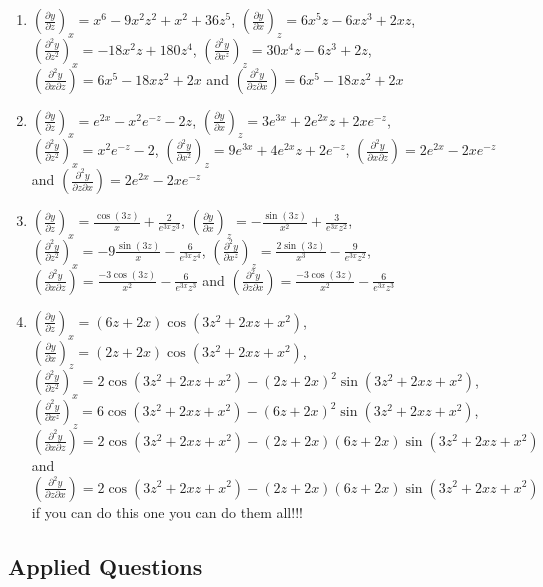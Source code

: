\documentclass[
]{book}
\begin{document}
\begin{enumerate}
\def\labelenumi{\arabic{enumi}.}
\item
  \(\left(\frac{\partial y}{\partial z}\right)_x= x^6-9x^2z^2+x^2+36z^5\),
  \(\left(\frac{\partial y}{\partial x}\right)_z=6x^5z-6xz^3+2xz\),
  \(\left(\frac{\partial^2 y}{\partial z^2}\right)_x=-18x^2z+180z^4\),
  \(\left(\frac{\partial^2 y}{\partial x^z}\right)_z=30x^4z-6z^3+2z\),
  \(\left(\frac{\partial^2 y}{\partial x \partial z}\right)=6x^5-18xz^2+2x\) and
  \(\left(\frac{\partial^2 y}{\partial z \partial x}\right)=6x^5-18xz^2+2x\)
\item
  \(\left(\frac{\partial y}{\partial z}\right)_x=e^{2x}-x^2e^{-z}-2z\),
  \(\left(\frac{\partial y}{\partial x}\right)_z=3e^{3x}+2e^{2x}z+2xe^{-z}\),
  \(\left(\frac{\partial^2 y}{\partial z^2}\right)_x=x^2e^{-z}-2\),
  \(\left(\frac{\partial^2 y}{\partial x^2}\right)_z=9e^{3x}+4e^{2x}z+ 2e^{-z}\),
  \(\left(\frac{\partial^2 y}{\partial x \partial z}\right)=2e^{2x}-2xe^{-z}\) and
  \(\left(\frac{\partial^2 y}{\partial z \partial x}\right)=2e^{2x}-2xe^{-z}\)
\item
  \(\left(\frac{\partial y}{\partial z}\right)_x=\frac{\cos (3z)}{x}+\frac{2}{e^{3x}z^3}\),
  \(\left(\frac{\partial y}{\partial x}\right)_z=-\frac{\sin (3z)}{x^2}+\frac{3}{e^{3x}z^2}\),
  \(\left(\frac{\partial^2 y}{\partial z^2}\right)_x=-9\frac{\sin (3z)}{x}-\frac{6}{e^{3x}z^4}\),
  \(\left(\frac{\partial^2 y}{\partial x^z}\right)_z=\frac{2\sin (3z)}{x^3}-\frac{9}{e^{3x}z^2}\),
  \(\left(\frac{\partial^2 y}{\partial x \partial z}\right)=\frac{-3\cos (3z)}{x^2}-\frac{6}{e^{3x}z^3}\) and
  \(\left(\frac{\partial^2 y}{\partial z \partial x}\right)=\frac{-3\cos (3z)}{x^2}-\frac{6}{e^{3x}z^3}\)
\item
  \(\left(\frac{\partial y}{\partial z}\right)_x=(6z+2x)\cos(3z^2+2xz+x^2)\),
  \(\left(\frac{\partial y}{\partial x}\right)_z=(2z+2x)\cos(3z^2+2xz+x^2)\),
  \(\left(\frac{\partial^2 y}{\partial z^2}\right)_x=2\cos(3z^2+2xz+x^2)-(2z+2x)^2\sin(3z^2+2xz+x^2)\),
  \(\left(\frac{\partial^2 y}{\partial x^z}\right)_z=6\cos(3z^2+2xz+x^2)-(6z+2x)^2\sin(3z^2+2xz+x^2)\),
  \(\left(\frac{\partial^2 y}{\partial x \partial z}\right)=2\cos(3z^2+2xz+x^2)-(2z+2x)(6z+2x)\sin(3z^2+2xz+x^2)\) and
  \(\left(\frac{\partial^2 y}{\partial z \partial x}\right)=2\cos(3z^2+2xz+x^2)-(2z+2x)(6z+2x)\sin(3z^2+2xz+x^2)\) if you can do this one you can do them all!!!
\end{enumerate}

\hypertarget{applied-questions-3}{%
\subsection{Applied Questions}\label{applied-questions-3}}
\end{document}

